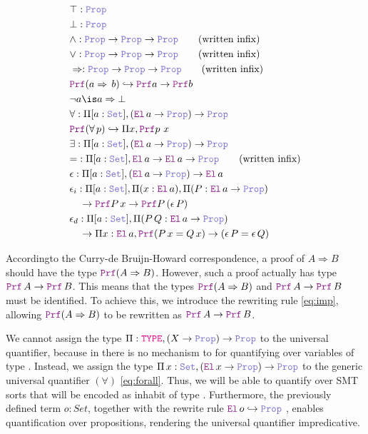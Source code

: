 \begin{definition}
\begin{align}
& \top : \prop \\
& \bot : \prop \\
& \land : \prop \ra \prop \ra \prop \qquad \text{(written inﬁx)} \\
& \lor : \prop \ra \prop \ra \prop \qquad \text{(written inﬁx)} \\
& \Rightarrow : \prop \ra \prop \ra \prop \qquad \text{(written inﬁx)} \\
&  \prf (a \Rightarrow\,b) \re \prf a \ra \prf b \label{eq:imp}\\
& \neg a \is a \Rightarrow \bot \\
& \forall : \Pi {[a: \set]}, (\el\, a \ra \prop) \ra \prop \label{eq:forall}\\
& \prf{}(\forall\,p) \re \Pi x, \prf{p~x}\\
& \exists : \Pi {[a: \set]}, (\el\, a \ra \prop) \ra \prop \\
& {=} : \Pi [a : \set], \el\, a \ra \el\, a \ra \prop \qquad \text{(written inﬁx)} \\
& \epsilon: \Pi {[a: \set]}, (\el\,a \ra \prop) \ra \el\,a \\
& \epsilon_i: \Pi {[a: \set]}, \Pi (x : \el\,a), \Pi (P : \el\,a \ra \prop) \\
& \quad \ra \prf P\,x \ra \prf P\,(\epsilon\,P) \\
& \epsilon_{d}: \Pi {[a: \set]}, \Pi (P\,Q : \el\,a \ra \prop) \\
& \quad \ra \Pi x : \el\,a, \prf (P\,x = Q\,x) \ra (\epsilon \, P = \epsilon \, Q)
\end{align}
\end{definition}

Accordingto the Curry-de Bruijn-Howard correspondence, a proof of $A \Rightarrow B$ should have the type $\prf (A \Rightarrow B)$.
However, such a proof actually has type $\prf\,A \ra \prf\,B$. This means that the types $\prf (A \Rightarrow B)$ and $\prf\,A \ra \prf\,B$ must be identiﬁed.
To achieve this, we introduce the rewriting rule \cref{eq:imp}, allowing $\prf (A \Rightarrow B)$ to be rewritten as $\prf\,A \ra \prf\,B$.

We cannot assign the type $\Pi : \type, (X \ra \prop) \ra \prop$ to the universal quantifier, because in \lpm{} there is no mechanism to
for quantifying over variables of type \type. Instead, we assign the type $\Pi\,x:\set{},(\el\,x \ra \prop) \ra \prop$ to the generic universal quantiﬁer $(\forall)$ \cref{eq:forall}.
Thus, we will be able to quantify over SMT sorts that will be encoded as inhabit of type \set. Furthermore, the previously defined term $o: Set$, together with the rewrite rule $\el\,o\index{o}  \hookrightarrow \prop$
, enables quantification over propositions, rendering the universal quantifier impredicative.


